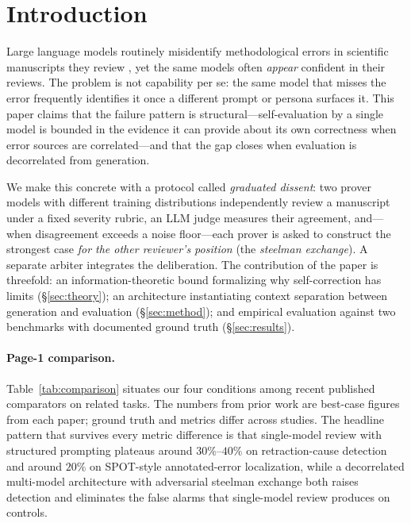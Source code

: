 \documentclass[11pt]{article}
\theoremstyle{definition}
\begin{document}
\begin{abstract}
conditional independence assumption between selector and target given the generator and a latent ``blind spot'' variable, $k$ correlated critiques contain no more information about correctness than the blind spot itself (Theorem~\ref{thm:info_bound}, Lemma~\ref{lem:repeated}, Proposition~\ref{prop:positive_evidence}).
\end{abstract}

\section{Introduction}
\label{sec:intro}

Large language models routinely misidentify methodological errors in scientific manuscripts they review \citep{son2025spot, liang2024can}, yet the same models often \emph{appear} confident in their reviews. The problem is not capability per se: the same model that misses the error frequently identifies it once a different prompt or persona surfaces it. This paper claims that the failure pattern is structural---self-evaluation by a single model is bounded in the evidence it can provide about its own correctness when error sources are correlated---and that the gap closes when evaluation is decorrelated from generation.

We make this concrete with a protocol called \emph{graduated dissent}: two prover models with different training distributions independently review a manuscript under a fixed severity rubric, an LLM judge measures their agreement, and---when disagreement exceeds a noise floor---each prover is asked to construct the strongest case \emph{for the other reviewer's position} (the \emph{steelman exchange}). A separate arbiter integrates the deliberation. The contribution of the paper is threefold: an information-theoretic bound formalizing why self-correction has limits (\S\ref{sec:theory}); an architecture instantiating context separation between generation and evaluation (\S\ref{sec:method}); and empirical evaluation against two benchmarks with documented ground truth (\S\ref{sec:results}).

\paragraph{Page-1 comparison.} Table~\ref{tab:comparison} situates our four conditions among recent published comparators on related tasks. The numbers from prior work are best-case figures from each paper; ground truth and metrics differ across studies. The headline pattern that survives every metric difference is that single-model review with structured prompting plateaus around $30\%$--$40\%$ on retraction-cause detection and around $20\%$ on SPOT-style annotated-error localization, while a decorrelated multi-model architecture with adversarial steelman exchange both raises detection and eliminates the false alarms that single-model review produces on controls.
\end{document}
